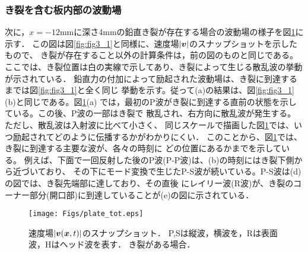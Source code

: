 \subsubsection{き裂を含む板内部の波動場}
次に，$x=-12$mmに深さ4mmの鉛直き裂が存在する場合の波動場の様子を図\ref{fig:fig3_2}に示す．
この図は図\ref{fig:fig3_1}と同様に、速度場$|\mbox{\boldmath $v$}|$のスナップショットを示したもので、
き裂が存在すること以外の計算条件は，前の図のものと同じである。
ここでは、き裂位置は白の実線で示してあり、き裂によって生じる散乱波の挙動が示されている．
鉛直力の付加によって励起された波動場は、き裂に到達するまでは図\ref{fig:fig3_1}と全く同じ
挙動を示す。従って(a)の結果は、図\ref{fig:fig3_1}(b)と同じである。図\ref{fig:fig3_2}(a)
では，最初のP波がき裂に到達する直前の状態を示している。この後、P波の一部はき裂で
散乱され、右方向に散乱波が発生する。ただし、散乱波は入射波に比べて小さく、
同じスケールで描画した図\ref{fig:fig3_2}では、いつ励起されてどのように伝播するかがわかりにくい．
このことから、図\ref{fig:fig3_2}では、き裂に到達する主要な波が、各々の時刻に
どの位置にあるかまでを示している。
例えば、下面で一回反射した後のP波(P-P波)は、(b)の時刻にはき裂下側から近づいており、
その下にモード変換で生じたP-S波が続いている。P-S波は(d)の図では、き裂先端部に達しており、その直後
にレイリー波(R波)が、き裂のコーナー部分(開口部)に到達していることが(e)の図に示されている．
\begin{figure}[h]
	\begin{center}
	\texttt{[image: Figs/plate\_tot.eps]} 
	\end{center}
	\caption{
		速度場$|\mbox{\boldmath $v$}(\mbox{\boldmath $x$},t)|$のスナップショット．
		P,Sは縦波，横波を，Rは表面波，Hはヘッド波を表す．
		き裂がある場合．
	} 
	\label{fig:fig3_2}
\end{figure}
